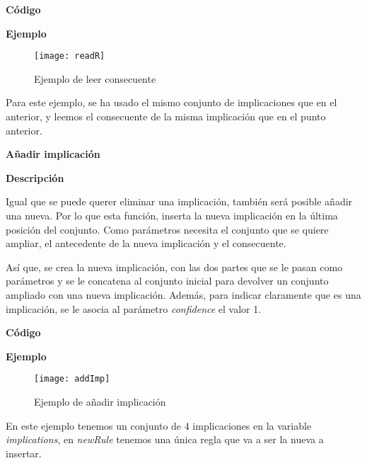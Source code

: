    \textbf{C\'odigo}

    
    \bigskip

    \textbf{Ejemplo}

    \begin{figure}[H]
        \centering
        \texttt{[image: readR]}
        \caption{Ejemplo de leer consecuente}
        \label{fig:readR}
    \end{figure}

    Para este ejemplo, se ha usado el mismo conjunto de implicaciones que en el anterior, y leemos el consecuente de la misma 
    implicaci\'on que en el punto anterior.
    \\

    \bigskip




\textbf{ \large A\~nadir implicaci\'on}

\smallskip

    \textbf{Descripci\'on}

    Igual que se puede querer eliminar una implicaci\'on, tambi\'en ser\'a posible a\~nadir una nueva. Por lo que esta funci\'on, 
    inserta la nueva implicaci\'on en la \'ultima posici\'on del conjunto. Como par\'ametros necesita el conjunto que se quiere ampliar, 
    el antecedente de la nueva implicaci\'on y el consecuente.

    As\'i que, se crea la nueva implicaci\'on, con las dos partes que se le pasan como par\'ametros y se le concatena al conjunto 
    inicial para devolver un conjunto ampliado con una nueva implicaci\'on. Adem\'as, para indicar claramente que es una implicaci\'on, 
    se le asocia al par\'ametro \textit{confidence} el valor 1.
    
    \clearpage

    \textbf{C\'odigo}

    
    \bigskip

    \textbf{Ejemplo}

    \begin{figure}[H]
        \centering
        \texttt{[image: addImp]}
        \caption{Ejemplo de a\~nadir implicaci\'on}
        \label{fig:addImp}
    \end{figure}

    En este ejemplo tenemos un conjunto de 4 implicaciones en la variable \textit{implications}, en \textit{newRule} tenemos una \'unica regla que va 
    a ser la nueva a insertar. 

